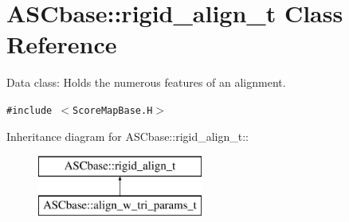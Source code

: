 \section{ASCbase::rigid\_\-align\_\-t Class Reference}
\label{classASCbase_1_1rigid__align__t}
Data class: Holds the numerous features of an alignment.  


{\tt \#include $<$Score\-Map\-Base.H$>$}

Inheritance diagram for ASCbase::rigid\_\-align\_\-t::\begin{figure}[H]
\begin{center}
\leavevmode
\includegraphics[height=2cm]{classASCbase_1_1rigid__align__t}
\end{center}
\end{figure}
